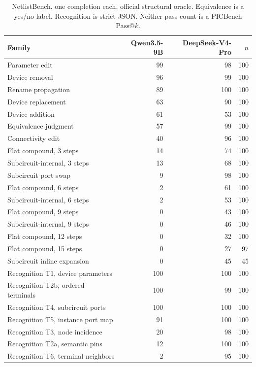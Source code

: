 \documentclass[11pt]{article}
\makeatletter
\newcommand{\passk}[1]{\mathrm{Pass@}#1}
\makeatother
\begin{document}
\begin{table}[H]
\caption{NetlistBench, one completion each, official structural oracle.
Equivalence is a yes/no label.
Recognition is strict JSON.
Neither pass count is a PICBench $\passk{k}$.}
\label{tab:spicefam}
\begin{center}
\begin{small}
\begin{tabular}{lrrr}
\toprule
Family & Qwen3.5-9B & DeepSeek-V4-Pro & $n$ \\
\midrule
Parameter edit & 99 & 98 & 100 \\
Device removal & 96 & 99 & 100 \\
Rename propagation & 89 & 100 & 100 \\
Device replacement & 63 & 90 & 100 \\
Device addition & 61 & 53 & 100 \\
Equivalence judgment & 57 & 99 & 100 \\
Connectivity edit & 40 & 96 & 100 \\
Flat compound, 3 steps & 14 & 74 & 100 \\
Subcircuit-internal, 3 steps & 13 & 68 & 100 \\
Subcircuit port swap & 9 & 98 & 100 \\
Flat compound, 6 steps & 2 & 61 & 100 \\
Subcircuit-internal, 6 steps & 2 & 53 & 100 \\
Flat compound, 9 steps & 0 & 43 & 100 \\
Subcircuit-internal, 9 steps & 0 & 46 & 100 \\
Flat compound, 12 steps & 0 & 32 & 100 \\
Flat compound, 15 steps & 0 & 27 & 97 \\
Subcircuit inline expansion & 0 & 45 & 45 \\
\midrule
Recognition T1, device parameters & 100 & 100 & 100 \\
Recognition T2b, ordered terminals & 100 & 99 & 100 \\
Recognition T4, subcircuit ports & 100 & 100 & 100 \\
Recognition T5, instance port map & 91 & 100 & 100 \\
Recognition T3, node incidence & 20 & 98 & 100 \\
Recognition T2a, semantic pins & 12 & 100 & 100 \\
Recognition T6, terminal neighbors & 2 & 95 & 100 \\
\bottomrule
\end{tabular}
\end{small}
\end{center}
\end{table}
\end{document}
